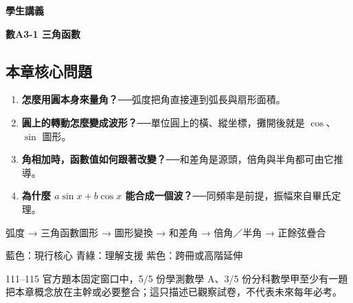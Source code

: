 \documentclass[11pt,a4paper]{article}
\providecommand{\tightlist}{%
  \setlength{\itemsep}{0pt}\setlength{\parskip}{0pt}}
\begin{document}
\begin{tcolorbox}[
  enhanced,colback=white,colframe=HandoutBlue,boxrule=1.1pt,arc=2mm,
  borderline west={3pt}{0pt}{HandoutBlue},left=5mm,right=4mm,top=4mm,bottom=4mm
]
{\sffamily\small\bfseries\color{HandoutBlue}學生講義}\par
{\sffamily\bfseries\LARGE\color{HandoutInk}數A3-1 三角函數}\par
\vspace{0.35em}{\large 用週期函數描述轉動，再合成同頻分量}\par
{}\par
{}\par
\end{tcolorbox}


\begin{HandoutLearningMap}

\subsection{本章核心問題}\label{ux672cux7ae0ux6838ux5fc3ux554fux984c}

\begin{enumerate}
\def\labelenumi{\arabic{enumi}.}
\tightlist
\item
  \textbf{怎麼用圓本身來量角？}──弧度把角直接連到弧長與扇形面積。
\item
  \textbf{圓上的轉動怎麼變成波形？}──單位圓上的橫、縱坐標，攤開後就是 \(\cos\)、\(\sin\) 圖形。
\item
  \textbf{角相加時，函數值如何跟著改變？}──和差角是源頭，倍角與半角都可由它推導。
\item
  \textbf{為什麼 \(a\sin x+b\cos x\) 能合成一個波？}──同頻率是前提，振幅來自畢氏定理。
\end{enumerate}

弧度 → 三角函數圖形 → 圖形變換 → 和差角 → 倍角／半角 → 正餘弦疊合

{藍色：現行核心}
{青綠：理解支援}
{紫色：跨冊或高階延伸}

111--115 官方題本固定窗口中，5/5 份學測數學 A、3/5 份分科數學甲至少有一題把本章概念放在主幹或必要整合；這只描述已觀察試卷，不代表未來每年必考。

\end{HandoutLearningMap}
\end{document}
